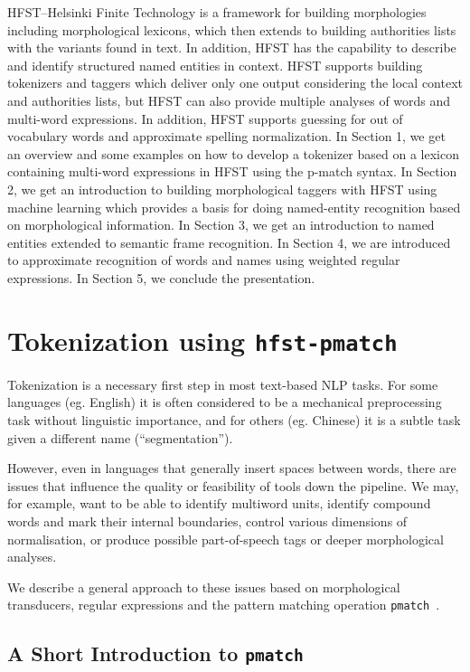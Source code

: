 \documentclass{llncs}
\begin{document}
HFST--Helsinki Finite Technology is a framework for building
morphologies including morphological lexicons, which then extends to
building authorities lists with the variants found in text. In
addition, HFST has the capability to describe and identify structured
named entities in context.  HFST supports building tokenizers and
taggers which deliver only one output considering the local context
and authorities lists, but HFST can also provide multiple analyses of
words and multi-word expressions. In addition, HFST supports guessing
for out of vocabulary words and approximate spelling normalization. In
Section 1, we get an overview and some examples on how to develop a
tokenizer based on a lexicon containing multi-word expressions in HFST
using the p-match syntax. In Section 2, we get an introduction to
building morphological taggers with HFST using machine learning which
provides a basis for doing named-entity recognition based on
morphological information. In Section 3, we get an introduction to
named entities extended to semantic frame recognition. In Section 4,
we are introduced to approximate recognition of words and names using
weighted regular expressions. In Section 5, we conclude the
presentation.

\section{Tokenization using {\tt hfst-pmatch}}\label{sec:tokenization}
Tokenization is a necessary first step in most text-based NLP tasks. For some
languages (eg. English) it is often considered to be a mechanical
preprocessing task without linguistic importance, and for others (eg. Chinese)
it is a subtle task given a different name (``segmentation'').

However, even in languages that generally insert spaces between words, there
are issues that influence the quality or feasibility of tools down the
pipeline. We may, for example, want to be able to identify multiword units,
identify compound words and mark their internal boundaries, control various
dimensions of normalisation, or produce possible part-of-speech tags or
deeper morphological analyses.

We describe a general approach to these issues based on morphological
transducers, regular expressions and the pattern matching operation
\verb+pmatch+~\cite{karttunen/2011}.

\subsection{A Short Introduction to {\tt pmatch}}
\end{document}
